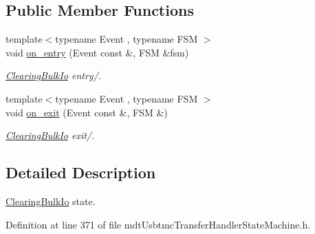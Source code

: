 \subsection*{Public Member Functions}
\begin{DoxyCompactItemize}
\item 
{\footnotesize template$<$typename Event , typename F\-S\-M $>$ }\\void \hyperlink{structmdt_usbtmc_transfer_handler_state_machine_1_1_running___1_1_clearing_bulk_io_a6bdacf2f6c5c9d6f0d1a1bd8fc9fd578}{on\-\_\-entry} (Event const \&, F\-S\-M \&fsm)
\begin{DoxyCompactList}\small\item\em \hyperlink{structmdt_usbtmc_transfer_handler_state_machine_1_1_running___1_1_clearing_bulk_io}{Clearing\-Bulk\-Io} entry/. \end{DoxyCompactList}\item 
{\footnotesize template$<$typename Event , typename F\-S\-M $>$ }\\void \hyperlink{structmdt_usbtmc_transfer_handler_state_machine_1_1_running___1_1_clearing_bulk_io_a5106df3c1c3024e1ee3a1eb0c6f5c40c}{on\-\_\-exit} (Event const \&, F\-S\-M \&)
\begin{DoxyCompactList}\small\item\em \hyperlink{structmdt_usbtmc_transfer_handler_state_machine_1_1_running___1_1_clearing_bulk_io}{Clearing\-Bulk\-Io} exit/. \end{DoxyCompactList}\end{DoxyCompactItemize}


\subsection{Detailed Description}
\hyperlink{structmdt_usbtmc_transfer_handler_state_machine_1_1_running___1_1_clearing_bulk_io}{Clearing\-Bulk\-Io} state. 

Definition at line 371 of file mdt\-Usbtmc\-Transfer\-Handler\-State\-Machine.\-h.



